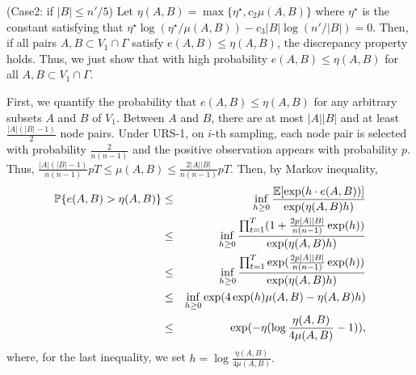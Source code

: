 \smallskip
\noindent(Case2: if $|B| \le n'/5$) 
Let $\eta(A,B) = \max\{\eta^{\star}, c_2 \mu(A,B) \}$ where
$\eta^{\star}$ is the constant satisfying that $ \eta^\star \log(\eta^\star/\mu (A,B)) - c_3 |B| \log
(n'/|B|) =0 .$ Then, if all pairs $A,B \subset V_1 \cap \Gamma$ satisfy
$e(A,B) \le \eta(A,B)$, the discrepancy property holds. Thus, we just show that with
high probability $e(A,B) \le \eta(A,B)$ for all $A,B \subset V_1 \cap \Gamma$.

First, we quantify the probability that $e(A,B) \le \eta(A,B)$
for any arbitrary subsets $A$ and $B$ of $V_1$. Between $A$ and $B$, there are at most $|A||B|$ and at least
$\frac{|A|(|B|-1)}{2}$ node pairs.  Under URS-1, on $i$-th sampling, each
node pair is selected with probability $\frac{2}{n(n-1)}$ and the
positive observation appears with probability $p.$ Thus,
$\frac{|A|(|B|-1)}{n(n-1)}pT \le \mu (A,B) \le \frac{2 |A||B|}{n(n-1)}pT .$
Then, by Markov inequality,
\begin{eqnarray}
\mathbb{P}\{ e(A,B) > \eta(A,B) \} & \le & \inf_{h \ge 0}\frac{\mathbb{E}[\exp (h \cdot  e(A,B))]}{\exp(\eta(A,B) h)} \cr
& \le & \inf_{h \ge 0} \frac{\prod_{t=1}^T (1+\frac{2p |A||B|}{n(n-1)}  \exp (h))}{\exp(\eta(A,B) h)}  \cr
& \le & \inf_{h \ge 0} \frac{\prod_{t=1}^T \exp(   \frac{2 p |A||B|
  }{n(n-1)} \exp(h))}{\exp(\eta(A,B) h)} \cr
& \le & \inf_{h \ge 0} \exp(  4\exp(h) \mu (A,B)  -\eta(A,B) h  ) \cr
& \le & \exp( -\eta (\log \frac{\eta(A,B)}{4 \mu (A,B)}-1)),\label{eq:c2pre}
\end{eqnarray}
where, for the last inequality, we set $h=\log \frac{\eta(A,B)}{4 \mu (A,B)}.$

